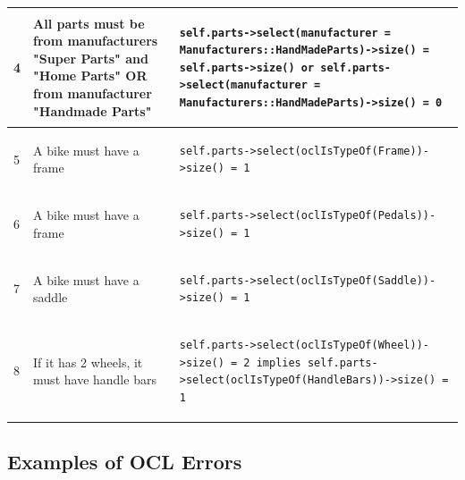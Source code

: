 \begin{table}[htp]
\begin{center}
\begin{tabular*}{\textwidth}{p{} p{}
	l{}}
4	&	All parts must be from manufacturers "Super Parts" and "Home Parts" OR from manufacturer "Handmade Parts" &
\begin{lstlisting}
self.parts->select(manufacturer = Manufacturers::HandMadeParts)->size() = self.parts->size() or self.parts->select(manufacturer = Manufacturers::HandMadeParts)->size() = 0
\end{lstlisting}  \\ \hline

5	&	A bike must have a frame &
\begin{lstlisting}
self.parts->select(oclIsTypeOf(Frame))->size() = 1
\end{lstlisting}  \\ \hline

6	&	A bike must have a frame &
\begin{lstlisting}
self.parts->select(oclIsTypeOf(Pedals))->size() = 1
\end{lstlisting}  \\ \hline

7	&	A bike must have a saddle &
\begin{lstlisting}
self.parts->select(oclIsTypeOf(Saddle))->size() = 1
\end{lstlisting}  \\ \hline

8	&	If it has 2 wheels, it must have handle bars &
\begin{lstlisting}
self.parts->select(oclIsTypeOf(Wheel))->size() = 2 implies self.parts->select(oclIsTypeOf(HandleBars))->size() = 1 
\end{lstlisting}  \\ \hline
	\end{tabular*}
\end{center}
\end{table}

\subsection{Examples of OCL Errors}
\label{appendix.ocl_gmf}

